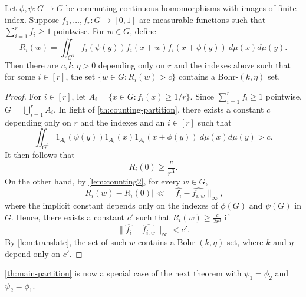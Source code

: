\begin{proposition} \label{prop:partition-bohr-stronger} 
Let $\phi, \psi: G \to G$ be commuting continuous homomorphisms with images of finite index. Suppose $f_1, \ldots, f_r: G \to [0,1]$ are measurable functions such that $\sum_{i=1}^r f_i \geq 1$ pointwise. For $w \in G$, define
\[
  R_i(w) =  \iint_{G^2}  f_i(\psi(y)) f_i(x+w) f_i(x + \phi(y)) \ d\mu(x) d\mu(y). 
\]
Then there are $c, k, \eta >0$ depending only on $r$ and the indexes above such that for some $i \in [r]$, the set
 $\{ w \in G: R_i(w) > c\}$ contains a Bohr-$(k,\eta)$ set. 
\end{proposition}
\begin{proof}

For $i \in [r]$, let $A_i = \{x \in G: f_i(x) \geq 1/r\}$. Since $\sum_{i=1}^r f_i \geq 1$ pointwise, $G = \bigcup_{i=1}^r A_i$. In light of \cref{th:counting-partition}, there exists a constant $c$ depending only on $r$ and the indexes and an $i \in [r]$ such that 
\[
    \iint_{G^2} 1_{A_i} (\psi(y)) 1_{A_i}(x) 1_{A_i}(x + \phi(y)) \ d\mu(x) d\mu(y) > c.
\]
It then follows that
\[
    R_i(0) \geq \frac{c}{r^3}.  
\]
On the other hand, by \cref{lem:counting2}, for every $w \in G$,
\begin{equation*}
\label{eq:partition_R_i}
    |R_i(w) - R_i(0)| \ll \lVert \widehat{f_i} - \widehat{f_{i,w}} \rVert_{\infty},
\end{equation*}
where the implicit constant depends only on the indexes of $\phi(G)$ and $\psi(G)$ in $G$. 
Hence, there exists a constant $c'$ such that $R_{i}(w) \geq \frac{c}{2r^3}$ if
\begin{equation*}
    \lVert \widehat{f_{i}} - \widehat{f_{i,w}} \rVert_{\infty} < c'.
\end{equation*}
By \cref{lem:translate}, the set of such $w$ contains a Bohr-$(k,\eta)$ set, where $k$ and $\eta$ depend only on $c'$.
\end{proof}
 
\cref{th:main-partition} is now a special case of the next theorem with $\psi_1 = \phi_2$ and $\psi_2 = \phi_1$. 

